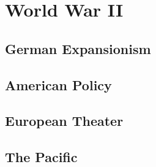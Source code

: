 \chapter{World War II}

\section{German Expansionism}

\section{American Policy}

\section{European Theater}

\section{The Pacific}

